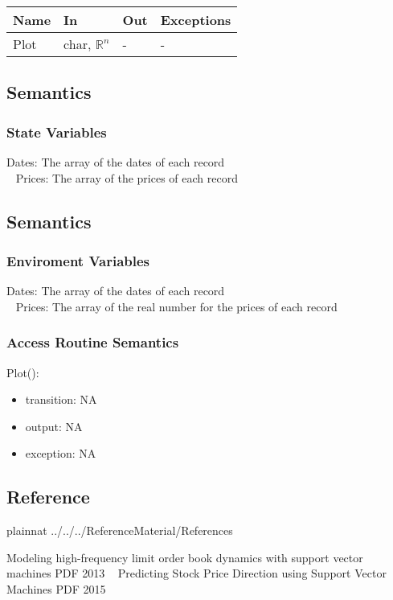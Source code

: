 \documentclass[12pt, titlepage]{article}
\begin{document}
\begin{center}
\begin{tabular}{p{2cm} p{4cm} p{2cm} p{2cm}}
\hline
\textbf{Name} & \textbf{In} & \textbf{Out} & \textbf{Exceptions} \\
\hline

Plot & char, $\mathbb{R}^n$ &- &- \\

\hline
\end{tabular}
\end{center}

\subsection{Semantics}
\subsubsection{State Variables}
Dates: The array of the dates of each record\\ 
~\newline
Prices: The array of the prices of each record

\subsection{Semantics}
\subsubsection{Enviroment Variables}
Dates: The array of the dates of each record\\ 
~\newline
Prices: The array of the real number for the prices of each record\\ 
\subsubsection{Access Routine Semantics}

\noindent Plot():
\begin{itemize}
\item transition: NA
\item output: NA
\item exception: NA
\end{itemize}

\newpage

\subsection{Reference}
 {plainnat}
 {../../../ReferenceMaterial/References}

Modeling high-frequency limit order book dynamics with support vector machines PDF 2013
~\newline
Predicting Stock Price Direction using Support Vector Machines PDF 2015
\end{document}
